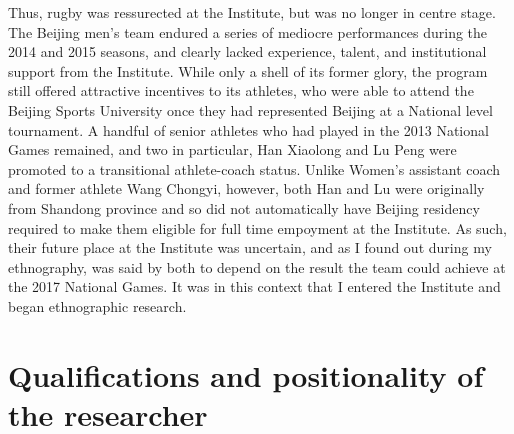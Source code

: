 {Thus, rugby was ressurected at the Institute, but was no longer in centre stage. The Beijing men's team endured a series of mediocre performances during the 2014 and 2015 seasons, and clearly lacked experience, talent, and institutional support from the Institute.  While only a shell of its former glory, the program still offered attractive incentives to its athletes, who were able to attend the Beijing Sports University once they had represented Beijing at a National level tournament.  A handful of senior athletes who had played in the 2013 National Games remained, and two in particular, Han Xiaolong and Lu Peng were promoted to a transitional athlete-coach status. Unlike Women's assistant coach and former athlete Wang Chongyi, however, both Han and Lu were originally from Shandong province and so did not automatically have Beijing residency required to make them eligible for full time empoyment at the Institute. As such, their future place at the Institute was uncertain, and as I found out during my ethnography, was said by both to depend on the result the team could achieve at the 2017 National Games. It was in this context that I entered the Institute and began ethnographic research.

\section{Qualifications and positionality of the researcher}

}
